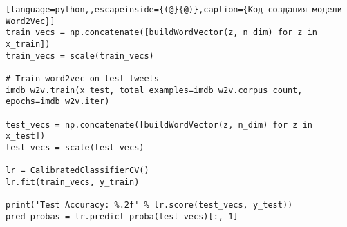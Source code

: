 \begin{lstlisting}[language=python,,escapeinside={(@}{@)},caption={Код создания модели Word2Vec}]
train_vecs = np.concatenate([buildWordVector(z, n_dim) for z in x_train])
train_vecs = scale(train_vecs)

# Train word2vec on test tweets
imdb_w2v.train(x_test, total_examples=imdb_w2v.corpus_count,
epochs=imdb_w2v.iter)

test_vecs = np.concatenate([buildWordVector(z, n_dim) for z in x_test])
test_vecs = scale(test_vecs)

lr = CalibratedClassifierCV()
lr.fit(train_vecs, y_train)

print('Test Accuracy: %.2f' % lr.score(test_vecs, y_test))
pred_probas = lr.predict_proba(test_vecs)[:, 1]

\end{lstlisting}